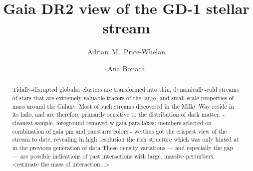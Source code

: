 \documentclass[modern]{aastex62}
\newcommand{\acronym}[1]{{\small{#1}}}
\newcommand{\gaia}{\textsl{Gaia}}
\newcommand{\pans}{\textsl{PanSTARRS}}
\newcommand{\DR}{\acronym{DR2}}
\begin{document}
\sloppy\sloppypar\raggedbottom\frenchspacing %

\title{Gaia DR2 view of the GD-1 stellar stream}

\author[0000-0003-0872-7098]{Adrian~M.~Price-Whelan}

\author[0000-0002-7846-9787]{Ana Bonaca}


\begin{abstract}\noindent %
Tidally-disrupted globular clusters are transformed into thin, dynamically-cold streams
of stars that are extremely valuable tracers of the large- and small-scale
properties of mass around the Galaxy.
Most of such streams discovered in the Milky Way reside in its halo, and are therefore primarily sensitive to the distribution of dark matter.
- cleanest sample, foreground removed w gaia parallaxes; members selected on combination of gaia pm and panstarrs colors
- we thus got the crispest view of the stream to date, revealing in high resolution the rich structure which was only hinted at in the previous generation of data
These density variations --- and especially the gap --- are possible indications
of past interactions with large, massive perturbers.
<estimate the mass of interaction...>
% 
\end{abstract}
\end{document}
